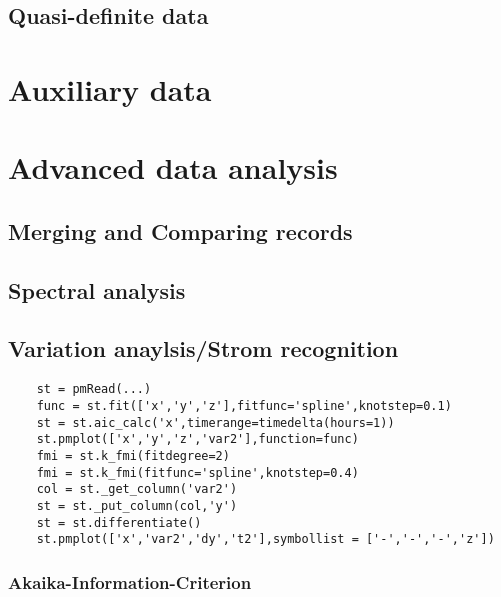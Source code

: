\subsection{Quasi-definite data}


\section{Auxiliary data}


\section{Advanced data analysis}

\subsection{Merging and Comparing records}

\subsection{Spectral analysis}

\subsection{Variation anaylsis/Strom recognition}

\begin{verbatim}
    st = pmRead(...)
    func = st.fit(['x','y','z'],fitfunc='spline',knotstep=0.1)
    st = st.aic_calc('x',timerange=timedelta(hours=1))
    st.pmplot(['x','y','z','var2'],function=func)
    fmi = st.k_fmi(fitdegree=2)
    fmi = st.k_fmi(fitfunc='spline',knotstep=0.4)
    col = st._get_column('var2')
    st = st._put_column(col,'y')
    st = st.differentiate()
    st.pmplot(['x','var2','dy','t2'],symbollist = ['-','-','-','z'])
\end{verbatim}


\subsubsection{Akaika-Information-Criterion}\label{AIC}

